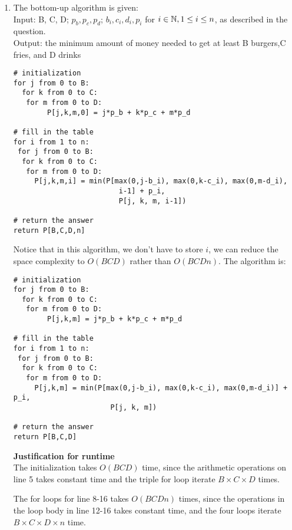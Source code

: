 \documentclass[11pt]{article}
\begin{document}
\begin{enumerate}
\begin{enumerate}
\begin{proof}
        - Suppose coupon $N_{i+1}$ is not used, then $P(j,k,m,i+1)=P(j,k,m,i)$ by the definition of $P$, then by induction hypothesis, $P(j,k,m,i+1)$ returns the correct number. 
        
        By taking the minimum of the two cases, $P(j,k,m,i)$ will return the minimum amount of money as specified. 
        \end{proof}
        \item The bottom-up algorithm is given: \\
        Input: B, C, D; $p_b, p_c, p_d$; $b_i, c_i, d_i, p_i$ for $i\in \mathbb N ,1 \leq i \leq n$, as described in the question.\\
        Output: the minimum amount of money needed to get at least B burgers,C fries, and D drinks
\begin{lstlisting}
# initialization
for j from 0 to B:
  for k from 0 to C:  
   for m from 0 to D:
        P[j,k,m,0] = j*p_b + k*p_c + m*p_d
        
# fill in the table
for i from 1 to n:
 for j from 0 to B:
  for k from 0 to C:  
   for m from 0 to D:
     P[j,k,m,i] = min(P[max(0,j-b_i), max(0,k-c_i), max(0,m-d_i),
                         i-1] + p_i,
	                     P[j, k, m, i-1])

# return the answer
return P[B,C,D,n]
\end{lstlisting}
    Notice that in this algorithm, we don't have to store $i$, we can reduce the space complexity to $O(BCD)$ rather than $O(BCDn)$. The algorithm is:
\begin{lstlisting}
# initialization
for j from 0 to B:
  for k from 0 to C:  
   for m from 0 to D:
        P[j,k,m] = j*p_b + k*p_c + m*p_d
        
# fill in the table
for i from 1 to n:
 for j from 0 to B:
  for k from 0 to C:  
   for m from 0 to D:
     P[j,k,m] = min(P[max(0,j-b_i), max(0,k-c_i), max(0,m-d_i)] + p_i,
	                   P[j, k, m])

# return the answer
return P[B,C,D]
\end{lstlisting}
    \textbf{Justification for runtime} \\
    The initialization takes $O(BCD)$ time, since the arithmetic operations on line 5 takes constant time and the triple for loop iterate $B\times C\times D$ times.
    
    The for loops for line 8-16 takes $O(BCDn)$ times, since the operations in the loop body in line 12-16 takes constant time, and the four loops iterate $B\times C\times D\times n$ time. 
    

\end{enumerate}
\end{enumerate}
\end{document}

